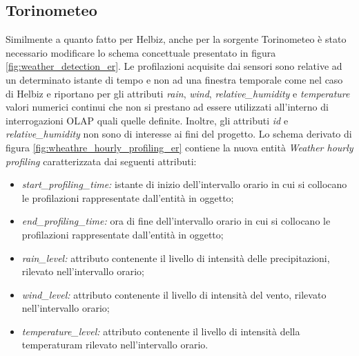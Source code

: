 \subsection{Torinometeo}

Similmente a quanto fatto per Helbiz, anche per la sorgente Torinometeo è
stato necessario modificare lo schema concettuale presentato in figura
\ref{fig:weather_detection_er}. Le profilazioni acquisite dai sensori
sono relative ad un determinato istante di tempo e non ad una finestra temporale
come nel caso di Helbiz e riportano per gli attributi \textit{rain},
\textit{wind}, \textit{relative\_humidity} e \textit{temperature} valori numerici
continui che non si prestano ad essere utilizzati all'interno di interrogazioni
OLAP quali quelle definite. Inoltre, gli attributi \textit{id} e
\textit{relative\_humidity} non sono di interesse ai fini del progetto.
Lo schema derivato di figura \ref{fig:wheathre_hourly_profiling_er} contiene la
nuova entità \textit{Weather hourly profiling} caratterizzata dai seguenti attributi:
\begin{itemize}
\item \textit{start\_profiling\_time:} istante di inizio dell'intervallo orario in cui
si collocano le profilazioni rappresentate dall'entità in oggetto;
\item \textit{end\_profiling\_time:} ora di fine dell'intervallo orario in cui si
collocano le profilazioni rappresentate dall'entità in oggetto;
\item \textit{rain\_level:} attributo contenente il livello di intensità delle
precipitazioni, rilevato nell'intervallo orario;
\item \textit{wind\_level:} attributo contenente il livello di intensità del
vento, rilevato nell'intervallo orario;
\item \textit{temperature\_level:} attributo contenente il livello di intensità della
temperaturam rilevato nell'intervallo orario.
\end{itemize}

